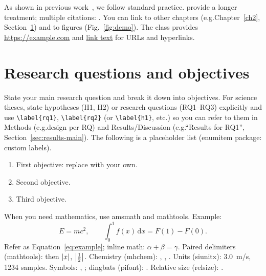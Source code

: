 As shown in previous work~\citep{example-paper}, we follow standard practice.
\citet{example-book} provide a longer treatment; multiple citations: \citep{example-paper,example-conf}. You can link to other chapters (e.g.\@ Chapter~\ref{ch2}, Section~\ref{sec:objectives}) and to figures (Fig.~\ref{fig:demo}). The class provides \url{https://example.com} and \href{https://example.com}{link text} for URLs and hyperlinks.


\section{Research questions and objectives}\label{sec:objectives}

State your main research question and break it down into objectives. For science theses, state hypotheses (H1, H2) or research questions (RQ1--RQ3) explicitly and use \verb|\label{rq1}|, \verb|\label{rq2}| (or \verb|\label{h1}|, etc.) so you can refer to them in Methods (e.g.\@ design per RQ) and Results/Discussion (e.g.\@ ``Results for RQ1'', Section~\ref{sec:results-main}). The following is a placeholder list (enumitem package: custom labels).

\begin{enumerate}[label=\textbf{O\arabic*:}, leftmargin=*]
  \item First objective: replace with your own.
  \item Second objective.
  \item Third objective.
\end{enumerate}

When you need mathematics, use amsmath and mathtools. Example:
\begin{equation}\label{eq:example}
  E = mc^2, \qquad \int_0^1 f(x)\,\mathrm{d}x = F(1) - F(0).
\end{equation}
Refer as Equation~\eqref{eq:example}; inline math: $\alpha + \beta = \gamma$. Paired delimiters (mathtools): \DeclarePairedDelimiter{\abs}{\lvert}{\rvert} then $\abs{x}$, $\abs*{\frac{1}{2}}$. Chemistry (mhchem): , , . Units (siunitx): \SI{3.0}{m/s}, \num{1234} samples. Symbols: \textdegree, \textcopyright; dingbats (pifont):  . Relative size (relsize):  .

